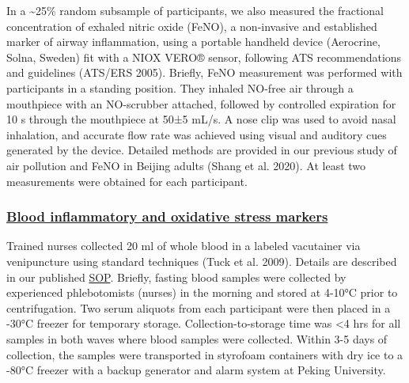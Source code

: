 \documentclass[
  letterpaper,
  DIV=11,
  numbers=noendperiod]{scrartcl}
\providecommand{\DIFadd}[1]{{\protect\color{blue}\underline{#1}}} %
\providecommand{\DIFaddbegin}{} %
\providecommand{\DIFaddend}{} %
\providecommand{\DIFdelbegin}{} %
\providecommand{\DIFdelend}{} %
\newcommand{\DIFscaledelfig}{0.5}
\newlength{\DIFdelgraphicswidth} %
\newlength{\DIFdelgraphicsheight} %
\newcommand{\DIFaddincludegraphics}[2][]{{\color{blue}\fbox{\DIFOincludegraphics[#1]{#2}}}} %
\newcommand{\DIFdelincludegraphics}[2][]{%
\sbox{\DIFdelgraphicsbox}{\DIFOincludegraphics[#1]{#2}}%
\settoboxwidth{\DIFdelgraphicswidth}{\DIFdelgraphicsbox} %
\settoboxtotalheight{\DIFdelgraphicsheight}{\DIFdelgraphicsbox} %
\scalebox{\DIFscaledelfig}{%
\parbox[b]{\DIFdelgraphicswidth}{\usebox{\DIFdelgraphicsbox}\\[-\baselineskip] \rule{\DIFdelgraphicswidth}{0em}}\llap{\resizebox{\DIFdelgraphicswidth}{\DIFdelgraphicsheight}{%
\setlength{\unitlength}{\DIFdelgraphicswidth}%
\begin{picture}(1,1)%
\thicklines\linethickness{2pt} %
{\color[rgb]{1,0,0}\put(0,0){\framebox(1,1){}}}%
{\color[rgb]{1,0,0}\put(0,0){\line( 1,1){1}}}%
{\color[rgb]{1,0,0}\put(0,1){\line(1,-1){1}}}%
\end{picture}%
}\hspace*{3pt}}} %
} %
\DeclareRobustCommand{\DIFaddbegin}{\DIFOaddbegin \let\includegraphics\DIFaddincludegraphics} %
\DeclareRobustCommand{\DIFaddend}{\DIFOaddend \let\includegraphics\DIFOincludegraphics} %
\DeclareRobustCommand{\DIFdelbegin}{\DIFOdelbegin \let\includegraphics\DIFdelincludegraphics} %
\DeclareRobustCommand{\DIFdelend}{\DIFOaddend \let\includegraphics\DIFOincludegraphics} %
\begin{document}
In a \textasciitilde25\% random subsample of participants, we also
measured the fractional concentration of exhaled nitric oxide (FeNO), a
non-invasive and established marker of airway inflammation, using a
portable handheld device (Aerocrine, Solna, Sweden) fit with a NIOX
VERO® sensor, following ATS recommendations and guidelines (ATS/ERS
2005). Briefly, FeNO measurement was performed with participants in a
standing position. They inhaled NO-free air through a mouthpiece with an
NO-scrubber attached, followed by controlled expiration for 10 s through
the mouthpiece at 50±5 mL/s. A nose clip was used to avoid nasal
inhalation, and accurate flow rate was achieved using visual and
auditory cues generated by the device. Detailed methods are provided in
our previous study of air pollution and FeNO in Beijing adults (Shang et
al. 2020). At least two measurements were obtained for each participant.

\DIFdelbegin %
\DIFdelend \DIFaddbegin \subsubsection{\DIFadd{Blood inflammatory and oxidative stress
markers}}\label{blood-inflammatory-and-oxidative-stress-markers}
\DIFaddend 

Trained nurses collected 20 ml of whole blood in a labeled vacutainer
via venipuncture using standard techniques (Tuck et al. 2009). Details
are described in our published \href{https://osf.io/zwpfg}{SOP}.
Briefly, fasting blood samples were collected by experienced
phlebotomists (nurses) in the morning and stored at 4-10°C prior to
centrifugation. Two serum aliquots from each participant were then
placed in a -30°C freezer for temporary storage. Collection-to-storage
time was \textless4 hrs for all samples in both waves where blood
samples were collected. Within 3-5 days of collection, the samples were
transported in styrofoam containers with dry ice to a -80°C freezer with
a backup generator and alarm system at Peking University.
\end{document}
